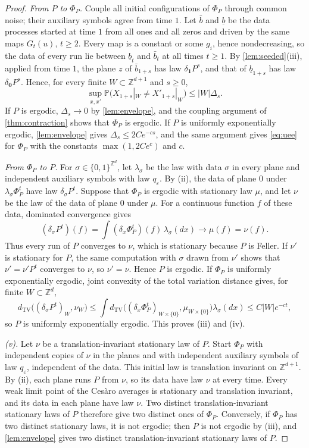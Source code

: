\documentclass[11pt]{article}
\theoremstyle{plain}
\theoremstyle{definition}
\theoremstyle{remark}
\newcommand{\Z}{\mathbb Z}
\newcommand{\Prob}{\mathbb P}
\newcommand{\eps}{\varepsilon}
\newcommand{\dtv}{d_{\mathrm{TV}}}
\begin{document}
\begin{proof}
\emph{From $P$ to $\Phi_P$.} Couple all initial configurations of $\Phi_P$ through common noise; their auxiliary symbols agree from time $1$. Let $\bar b$ and $\underline b$ be the data processes started at time $1$ from all ones and all zeros and driven by the same maps $G_t(u)$, $t\geq2$. Every map is a constant or some $g_i$, hence nondecreasing, so the data of every run lie between $\underline b_t$ and $\bar b_t$ at all times $t\geq1$. By \cref{lem:seeded}(iii), applied from time $1$, the plane $z$ of $\bar b_{1+s}$ has law $\delta_{\mathbf1}P^s$, and that of $\underline b_{1+s}$ has law $\delta_{\mathbf0}P^s$. Hence, for every finite $W\subset\Z^{d+1}$ and $s\geq0$,
\begin{equation}\label{eq:compiler-bracket}
 \sup_{x,x'}\Prob\bigl(X_{1+s}|_W\ne X'_{1+s}|_W\bigr)\leq|W|\Delta_s .
\end{equation}
If $P$ is ergodic, $\Delta_s\to0$ by \cref{lem:envelope}, and the coupling argument of \cref{thm:contraction} shows that $\Phi_P$ is ergodic. If $P$ is uniformly exponentially ergodic, \cref{lem:envelope} gives $\Delta_s\leq2Ce^{-cs}$, and the same argument gives \eqref{eq:uee} for $\Phi_P$ with the constants $\max(1,2Ce^c)$ and $c$.

\emph{From $\Phi_P$ to $P$.} For $\sigma\in\{0,1\}^{\Z^d}$, let $\lambda_\sigma$ be the law with data $\sigma$ in every plane and independent auxiliary symbols with law $q_\eps$. By (ii), the data of plane $0$ under $\lambda_\sigma\Phi_P^t$ have law $\delta_\sigma P^t$. Suppose that $\Phi_P$ is ergodic with stationary law $\mu$, and let $\nu$ be the law of the data of plane $0$ under $\mu$. For a continuous function $f$ of these data, dominated convergence gives
\[
 (\delta_\sigma P^t)(f)=\int(\delta_x\Phi_P^t)(f)\,\lambda_\sigma(dx)\to\mu(f)=\nu(f).
\]
Thus every run of $P$ converges to $\nu$, which is stationary because $P$ is Feller. If $\nu'$ is stationary for $P$, the same computation with $\sigma$ drawn from $\nu'$ shows that $\nu'=\nu'P^t$ converges to $\nu$, so $\nu'=\nu$. Hence $P$ is ergodic. If $\Phi_P$ is uniformly exponentially ergodic, joint convexity of the total variation distance gives, for finite $W\subset\Z^d$,
\[
 \dtv\bigl((\delta_\sigma P^t)_W,\nu_W\bigr)
 \leq\int\dtv\bigl((\delta_x\Phi_P^t)_{W\times\{0\}},\mu_{W\times\{0\}}\bigr)\lambda_\sigma(dx)
 \leq C|W|e^{-ct},
\]
so $P$ is uniformly exponentially ergodic. This proves (iii) and (iv).

\emph{(v).} Let $\nu$ be a translation-invariant stationary law of $P$. Start $\Phi_P$ with independent copies of $\nu$ in the planes and with independent auxiliary symbols of law $q_\eps$, independent of the data. This initial law is translation invariant on $\Z^{d+1}$. By (ii), each plane runs $P$ from $\nu$, so its data have law $\nu$ at every time. Every weak limit point of the Ces\`aro averages is stationary and translation invariant, and its data in each plane have law $\nu$. Two distinct translation-invariant stationary laws of $P$ therefore give two distinct ones of $\Phi_P$. Conversely, if $\Phi_P$ has two distinct stationary laws, it is not ergodic; then $P$ is not ergodic by (iii), and \cref{lem:envelope} gives two distinct translation-invariant stationary laws of $P$.
\end{proof}
\end{document}
